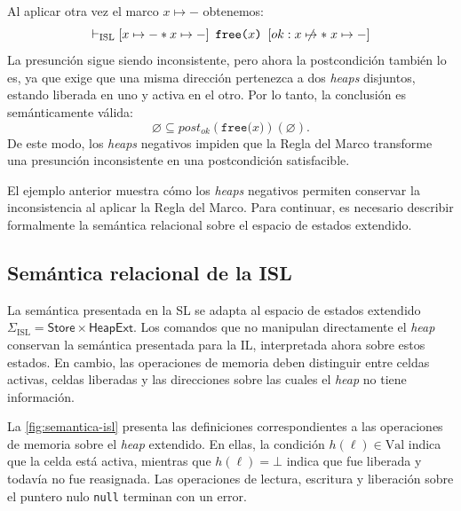 \documentclass[a4paper,	11pt]{report}
\begin{document}
Al aplicar otra vez el marco $x \mapsto -$ obtenemos:
$$\vdash_{\mathrm{ISL}} \itriple{x \mapsto - * x \mapsto -}{\texttt{free(}x\texttt{)}}{ok : x \nmapsto * \; x \mapsto -}$$
La presunción sigue siendo inconsistente,
pero ahora la postcondición también lo es,
ya que exige que una misma dirección pertenezca a dos \emph{heaps} disjuntos,
estando liberada en uno y activa en el otro.
Por lo tanto, la conclusión es semánticamente válida:
$$\varnothing \subseteq post_{ok}(\texttt{free(}x\texttt{)})(\varnothing).$$
De este modo,
los \emph{heaps} negativos impiden que la Regla del Marco transforme una presunción inconsistente en una postcondición satisfacible.

El ejemplo anterior muestra cómo los \emph{heaps} negativos permiten conservar la inconsistencia al aplicar la Regla del Marco.
Para continuar,
es necesario describir formalmente la semántica relacional sobre el espacio de estados extendido.

\subsection*{Semántica relacional de la ISL}
La semántica presentada en la SL se adapta al espacio de estados extendido
$\Sigma_{\mathrm{ISL}} = \mathsf{Store} \times \mathsf{HeapExt}$.
Los comandos que no manipulan directamente el \emph{heap} conservan la semántica presentada para la IL,
interpretada ahora sobre estos estados.
En cambio,
las operaciones de memoria deben distinguir entre celdas activas,
celdas liberadas y las direcciones sobre las cuales el \emph{heap} no tiene información.

La \autoref{fig:semantica-isl} presenta las definiciones correspondientes a las operaciones de memoria sobre el \emph{heap} extendido.
En ellas,
la condición $h(\ell) \in \mathrm{Val}$ indica que la celda está activa,
mientras que $h(\ell) = \bot$ indica que fue liberada y todavía no fue reasignada.
Las operaciones de lectura, escritura y liberación sobre el puntero nulo \texttt{null} terminan con un error.
\end{document}
